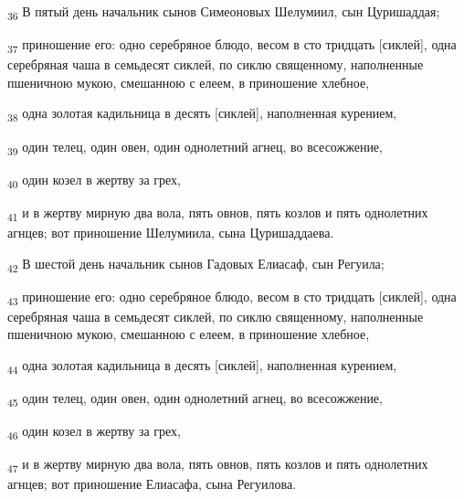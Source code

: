 \begin{tcolorbox}
\textsubscript{36} В пятый день начальник сынов Симеоновых Шелумиил, сын Цуришаддая;
\end{tcolorbox}
\begin{tcolorbox}
\textsubscript{37} приношение его: одно серебряное блюдо, весом в сто тридцать [сиклей], одна серебряная чаша в семьдесят сиклей, по сиклю священному, наполненные пшеничною мукою, смешанною с елеем, в приношение хлебное,
\end{tcolorbox}
\begin{tcolorbox}
\textsubscript{38} одна золотая кадильница в десять [сиклей], наполненная курением,
\end{tcolorbox}
\begin{tcolorbox}
\textsubscript{39} один телец, один овен, один однолетний агнец, во всесожжение,
\end{tcolorbox}
\begin{tcolorbox}
\textsubscript{40} один козел в жертву за грех,
\end{tcolorbox}
\begin{tcolorbox}
\textsubscript{41} и в жертву мирную два вола, пять овнов, пять козлов и пять однолетних агнцев; вот приношение Шелумиила, сына Цуришаддаева.
\end{tcolorbox}
\begin{tcolorbox}
\textsubscript{42} В шестой день начальник сынов Гадовых Елиасаф, сын Регуила;
\end{tcolorbox}
\begin{tcolorbox}
\textsubscript{43} приношение его: одно серебряное блюдо, весом в сто тридцать [сиклей], одна серебряная чаша в семьдесят сиклей, по сиклю священному, наполненные пшеничною мукою, смешанною с елеем, в приношение хлебное,
\end{tcolorbox}
\begin{tcolorbox}
\textsubscript{44} одна золотая кадильница в десять [сиклей], наполненная курением,
\end{tcolorbox}
\begin{tcolorbox}
\textsubscript{45} один телец, один овен, один однолетний агнец, во всесожжение,
\end{tcolorbox}
\begin{tcolorbox}
\textsubscript{46} один козел в жертву за грех,
\end{tcolorbox}
\begin{tcolorbox}
\textsubscript{47} и в жертву мирную два вола, пять овнов, пять козлов и пять однолетних агнцев; вот приношение Елиасафа, сына Регуилова.
\end{tcolorbox}

